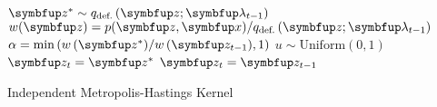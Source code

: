 \begin{center}
  \begin{center}
\begin{minipage}[c]{0.62\textwidth}
  \begin{algorithm2e}[H]
    \DontPrintSemicolon
    \SetAlgoLined
    \(\vz^* \sim q_{\text{def.}}\left(\vz; \vlambda_{t-1}\right)\)\;
    \(w(\vz) = p(\vz,\vx)/q_{\text{def.}}\left(\vz; \vlambda_{t-1}\right) \)\;
    \(\alpha = \min\left( w\,(\vz^*)/w\,(\vz_{t-1}), 1\right)\)\;
    \(u \sim \mathrm{Uniform}(0, 1) \)\;
        {
          \(\vz_t = \vz^*\)
        }
        {
          \(\vz_t = \vz_{t-1}\)
        }
        \caption{Independent Metropolis-Hastings Kernel}
  \end{algorithm2e}
\end{minipage}
  \end{center}

\end{center}

